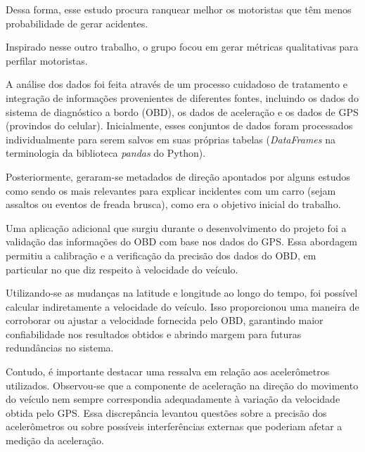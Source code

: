 Dessa forma, esse estudo procura ranquear melhor os motoristas que têm menos probabilidade de gerar acidentes.

Inspirado nesse outro trabalho, o grupo focou em gerar métricas qualitativas para perfilar motoristas.


A análise dos dados foi feita através de um processo cuidadoso de tratamento e integração de informações provenientes de diferentes fontes, incluindo os dados do sistema de diagnóstico a bordo (OBD), os dados de aceleração e os dados de GPS (provindos do celular). Inicialmente, esses conjuntos de dados foram processados individualmente para serem salvos em suas próprias tabelas (\textit{DataFrames} na terminologia da biblioteca \textit{pandas} do Python).

Posteriormente, geraram-se metadados de direção apontados por alguns estudos como sendo os mais relevantes para explicar incidentes com um carro (sejam assaltos ou eventos de freada brusca), como era o objetivo inicial do trabalho.


Uma aplicação adicional que surgiu durante o desenvolvimento do projeto foi a validação das informações do OBD com base nos dados do GPS. Essa abordagem permitiu a calibração e a verificação da precisão dos dados do OBD, em particular no que diz respeito à velocidade do veículo.

Utilizando-se as mudanças na latitude e longitude ao longo do tempo, foi possível calcular indiretamente a velocidade do veículo. Isso proporcionou uma maneira de corroborar ou ajustar a velocidade fornecida pelo OBD, garantindo maior confiabilidade nos resultados obtidos e abrindo margem para futuras redundâncias no sistema.

Contudo, é importante destacar uma ressalva em relação aos acelerômetros utilizados. Observou-se que a componente de aceleração na direção do movimento do veículo nem sempre correspondia adequadamente à variação da velocidade obtida pelo GPS. Essa discrepância levantou questões sobre a precisão dos acelerômetros ou sobre possíveis interferências externas que poderiam afetar a medição da aceleração.

